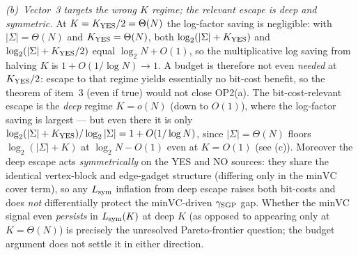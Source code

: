 \documentclass[
]{article}
\begin{document}
\emph{(b)~Vector~3 targets the wrong $K$ regime; the relevant escape
is deep and symmetric.} At $K = K_{\rm YES}/2 = \Theta(N)$ the
log-factor saving is negligible: with $|\Sigma| = \Theta(N)$ and
$K_{\rm YES} = \Theta(N)$, both $\log_2(|\Sigma| + K_{\rm YES})$ and
$\log_2(|\Sigma| + K_{\rm YES}/2)$ equal $\log_2 N + O(1)$, so the
multiplicative log saving from halving $K$ is $1 + O(1/\log N) \to 1$.
A budget is therefore not even \emph{needed} at $K_{\rm YES}/2$:
escape to that regime yields essentially no bit-cost benefit, so the
theorem of item~3 (even if true) would not close OP2(a). The
bit-cost-relevant escape is the \emph{deep} regime $K = o(N)$ (down
to $O(1)$), where the log-factor saving is largest --- but even there
it is only $\log_2(|\Sigma| + K_{\rm YES})/\log_2|\Sigma| = 1 +
O(1/\log N)$, since $|\Sigma| = \Theta(N)$ floors $\log_2(|\Sigma| +
K)$ at $\log_2 N - O(1)$ even at $K = O(1)$ (see (c)). Moreover the deep
escape acts \emph{symmetrically} on the YES and NO sources: they
share the identical vertex-block and edge-gadget structure (differing
only in the $\mathrm{minVC}$ cover term), so any $L_{\rm sym}$
inflation from deep escape raises both bit-costs and does \emph{not}
differentially protect the $\mathrm{minVC}$-driven $\gamma_{\rm SGP}$
gap. Whether the $\mathrm{minVC}$ signal even \emph{persists} in
$L_{\rm sym}(K)$ at deep $K$ (as opposed to appearing only at
$K = \Theta(N)$) is precisely the unresolved Pareto-frontier question;
the budget argument does not settle it in either direction.
\end{document}
